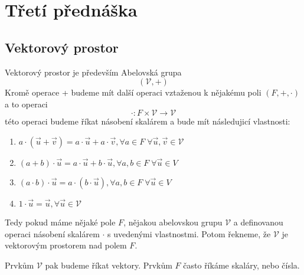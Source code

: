 \section{Třetí přednáška}

\subsection{Vektorový prostor}
\begin{definition}

    Vektorový prostor je především Abelovská grupa
    $$(\mathcal{V}, +)$$
    Kromě operace + budeme mít další operaci vztaženou k nějakému poli $(F, +, \cdot)$
    a to operaci
    $$\cdot: F \times \mathcal{V} \rightarrow \mathcal{V}$$
    této operaci budeme říkat násobení skalárem a bude mít následujicí vlastnosti:
    \begin{enumerate}
        \item $a \cdot (\vec{u} + \vec{v}) = a \cdot \vec{u} + a \cdot \vec{v}, \forall
            a \in F \; \forall \vec{u}, \vec{v} \in \mathcal{V}$
        \item $(a + b) \cdot \vec{u} = a \cdot \vec{u} + b \cdot \vec{u},
            \forall a,b \in F \; \forall \vec{u} \in V$
        \item $(a \cdot b ) \cdot \vec{u} = a \cdot (b \cdot \vec{u}),
            \forall a,b \in F \; \forall \vec{u} \in V$
        \item $1 \cdot \vec{u} = \vec{u}, \forall \vec{u} \in \mathcal{V}$
    \end{enumerate}
    Tedy pokud máme nějaké pole $F$, nějakou abelovskou grupu $\mathcal{V}$ a definovanou operaci
    násobení skalárem $\cdot$ s uvedenými vlastnostmi. Potom řekneme, že $\mathcal{V}$ je
    vektorovým prostorem nad polem $F$.

    Prvkům $\mathcal{V}$ pak budeme říkat vektory. Prvkům $F$ často říkáme skaláry,
    nebo čísla.
    \label{def:vector_space}
\end{definition}
